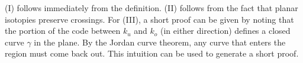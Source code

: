 (I) follows immediately from the definition. (II) follows from the
fact that planar isotopies preserve crossings. For (III), a short
proof can be given by noting that the portion of the code between
$k_u$ and $k_o$ (in either direction) defines a closed curve $\gamma$
in the plane. By the Jordan curve theorem, any curve that enters the
region must come back out. This intuition can be used to generate a
short proof.

